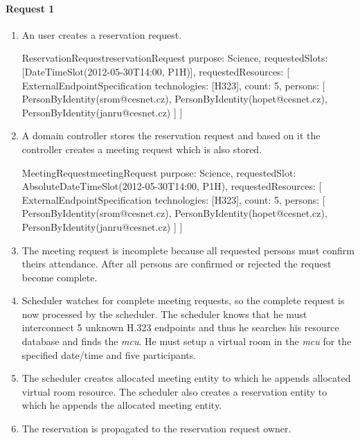 \paragraph{Request 1}
\begin{enumerate}
\item An user creates a reservation request.

\begin{EntityExample}{ReservationRequest}{reservationRequest}{}
purpose: Science,
requestedSlots: [DateTimeSlot(2012-05-30T14:00, P1H)],
requestedResources: [
  ExternalEndpointSpecification {
    technologies: [H323],
    count: 5,
    persons: [
      PersonByIdentity(srom@cesnet.cz),
      PersonByIdentity(hopet@cesnet.cz),
      PersonByIdentity(janru@cesnet.cz)
    ]
  }
]
\end{EntityExample}

\item A domain controller stores the reservation request and based on it the controller creates a meeting request which is also stored.

\begin{EntityExample}{MeetingRequest}{meetingRequest}{}
purpose: Science,
requestedSlot: AbsoluteDateTimeSlot(2012-05-30T14:00, P1H),
requestedResources: [
  ExternalEndpointSpecification {
    technologies: [H323],
    count: 5,
    persons: [
      PersonByIdentity(srom@cesnet.cz),
      PersonByIdentity(hopet@cesnet.cz),
      PersonByIdentity(janru@cesnet.cz)
    ]
  }
]
\end{EntityExample}

\item The meeting request is incomplete because all requested persons must
confirm theirs attendance. After all persons are confirmed or rejected
the request become complete.

\item Scheduler watches for complete meeting requests, so the complete 
request is now processed by the scheduler. The scheduler knows that he must 
interconnect 5 unknown H.323 endpoints and thus he searches his resource 
database and finds the \emph{mcu}. He must setup a virtual room in the 
\emph{mcu} for the specified date/time and five participants.

\item The scheduler creates allocated meeting entity to which he appends 
allocated virtual room resource. The scheduler also creates a reservation
entity to which he appends the allocated meeting entity.

\item The reservation is propagated to the reservation request owner.


\end{enumerate}

